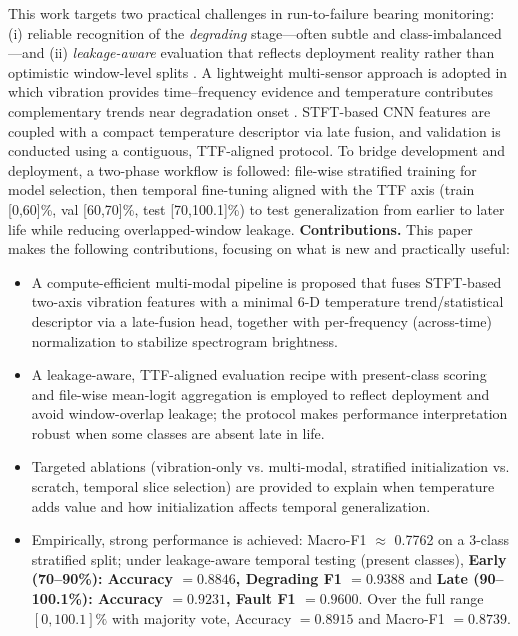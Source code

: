 \documentclass[pdflatex,sn-mathphys-num]{sn-jnl}%
\begin{document}
This work targets two practical challenges in run-to-failure bearing monitoring: (i) reliable recognition of the \emph{degrading} stage—often subtle and class-imbalanced—and (ii) \emph{leakage-aware} evaluation that reflects deployment reality rather than optimistic window-level splits \cite{jung2024dib_rtf,kaufman2012leakage,bergmeir2012timeseriescv}. A lightweight multi-sensor approach is adopted in which vibration provides time--frequency evidence and temperature contributes complementary trends near degradation onset \cite{baltrusaitis2019multimodal}. STFT-based CNN features are coupled with a compact temperature descriptor via late fusion, and validation is conducted using a contiguous, TTF-aligned protocol.
To bridge development and deployment, a two-phase workflow is followed: file-wise stratified training for model selection, then temporal fine-tuning aligned with the TTF axis (train [0,60]\%, val [60,70]\%, test [70,100.1]\%) to test generalization from earlier to later life while reducing overlapped-window leakage.
\textbf{Contributions.} This paper makes the following contributions, focusing on what is new and practically useful:
\begin{itemize}
    \item A compute-efficient multi-modal pipeline is proposed that fuses STFT-based two-axis vibration features with a minimal 6-D temperature trend/statistical descriptor via a late-fusion head, together with per-frequency (across-time) normalization to stabilize spectrogram brightness.
    \item A leakage-aware, TTF-aligned evaluation recipe with present-class scoring and file-wise mean-logit aggregation is employed to reflect deployment and avoid window-overlap leakage; the protocol makes performance interpretation robust when some classes are absent late in life.
    \item Targeted ablations (vibration-only vs. multi-modal, stratified initialization vs. scratch, temporal slice selection) are provided to explain when temperature adds value and how initialization affects temporal generalization.
    \item Empirically, strong performance is achieved: Macro-F1 $\approx$ 0.7762 on a 3-class stratified split; under leakage-aware temporal testing (present classes), \textbf{Early (70--90\%): Accuracy $=0.8846$, Degrading F1 $=0.9388$} and \textbf{Late (90--100.1\%): Accuracy $=0.9231$, Fault F1 $=0.9600$}. Over the full range $[0,100.1]\%$ with majority vote, Accuracy $=0.8915$ and Macro-F1 $=0.8739$.
\end{itemize}
\end{document}
